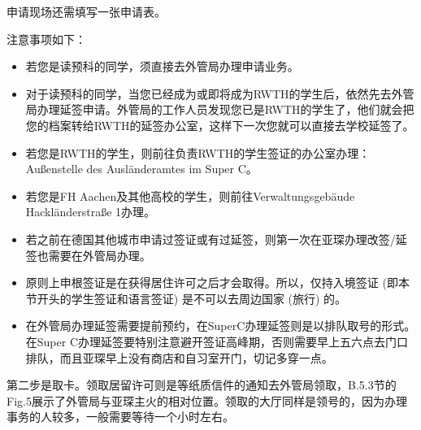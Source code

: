   申请现场还需填写一张申请表。

  注意事项如下：

  \begin{itemize}
    \item 若您是读预科的同学，须直接去外管局办理申请业务。
    \item 对于读预科的同学，当您已经成为或即将成为RWTH的学生后，依然先去外管局办理延签申请。外管局的工作人员发现您已是RWTH的学生了，他们就会把您的档案转给RWTH的延签办公室，这样下一次您就可以直接去学校延签了。
    \item 若您是RWTH的学生，则前往负责RWTH的学生签证的办公室办理：Außenstelle des Ausländeramtes im Super C。
    \item 若您是FH Aachen及其他高校的学生，则前往Verwaltungsgebäude Hackländerstraße 1办理。
    \item 若之前在德国其他城市申请过签证或有过延签，则第一次在亚琛办理改签/延签也需要在外管局办理。
    \item 原则上申根签证是在获得居住许可之后才会取得。所以，仅持入境签证 (即本节开头的学生签证和语言签证) 是不可以去周边国家 (旅行) 的。
    \item 在外管局办理延签需要提前预约，在SuperC办理延签则是以排队取号的形式。在Super C办理延签要特别注意避开签证高峰期，否则需要早上五六点去门口排队，而且亚琛早上没有商店和自习室开门，切记多穿一点。
  \end{itemize}

  第二步是取卡。领取居留许可则是等纸质信件的通知去外管局领取，B.5.3节的Fig.5展示了外管局与亚琛主火的相对位置。领取的大厅同样是领号的，因为办理事务的人较多，一般需要等待一个小时左右。
